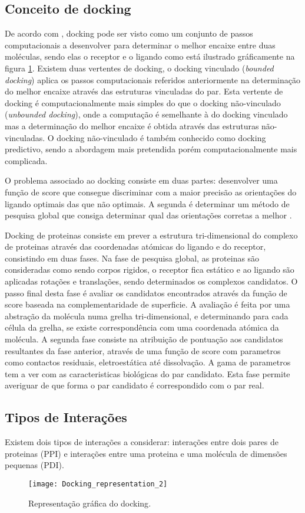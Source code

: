 \subsection{Conceito de docking}
De acordo com \cite{halperin}, docking pode ser visto como um conjunto de passos computacionais a desenvolver para determinar o melhor encaixe entre duas moléculas, sendo elas o receptor e o ligando como está ilustrado gráficamente na figura \ref{dockGraf}. Existem duas vertentes de docking, o docking vinculado (\textit{bounded docking}) aplica os passos computacionais referidos anteriormente na determinação do melhor encaixe através das estruturas vinculadas do par. Esta vertente de docking é computacionalmente mais simples do que o docking não-vinculado (\textit{unbounded docking}), onde a computação é semelhante à do docking vinculado mas a determinação do melhor encaixe é obtida através das estruturas não-vinculadas. O docking não-vinculado é também conhecido como docking predictivo, sendo a abordagem mais pretendida porém computacionalmente mais complicada. \par
O problema associado ao docking consiste em duas partes: desenvolver uma função de score que consegue discriminar com a maior precisão as orientações do ligando optimais das que não optimais.  A segunda é determinar um método de pesquisa global que consiga determinar qual das orientações corretas a melhor \cite{prediction}. \par
 Docking de proteinas consiste em prever a estrutura tri-dimensional do complexo de proteinas através das coordenadas atómicas do ligando e do receptor, consistindo em duas fases. Na fase de pesquisa global, as proteinas são consideradas como sendo corpos rigidos, o receptor fica estático e ao ligando são aplicadas rotações e translações, sendo determinados os complexos candidatos. O passo final desta fase é avaliar os candidatos encontrados através da função de score baseada na complementaridade de superficie. A avaliação é feita por uma abstração da molécula numa grelha tri-dimensional, e determinando para cada célula da grelha, se existe correspondência com uma coordenada atómica da molécula. A segunda fase consiste na atribuição de pontuação aos candidatos resultantes da fase anterior, através de uma função de score com parametros como contactos residuais, eletroestática até dissolvação. A gama de parametros tem a ver com as caracteristicas biológicas do par candidato. Esta fase permite averiguar de que forma o par candidato é correspondido com o par real\cite{bigger2016}.
\subsection{Tipos de Interações}
Existem dois tipos de interações a considerar: interações entre dois pares de proteinas (PPI) e interações entre uma proteina e uma molécula de dimensões pequenas (PDI).
\begin{figure}[ht]
  \centering
    {\texttt{[image: Docking\_representation\_2]}}
  \caption{Representação gráfica do docking\cite{dockingWiki}.}
  \label{dockGraf}
\end{figure}
